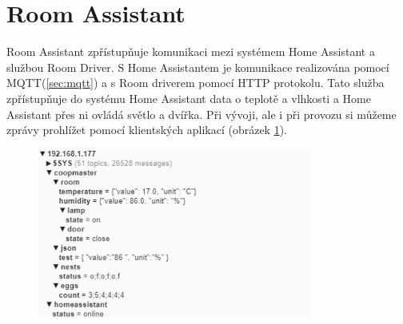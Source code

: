 \section{Room Assistant}\label{sec:room-assistant}

Room Assistant zpřístupňuje komunikaci mezi systémem Home Assistant a službou Room Driver.\newline
S Home Assistantem je komunikace realizována pomocí MQTT(\ref{sec:mqtt}) a s Room driverem pomocí HTTP protokolu.
Tato služba zpřístupňuje do systému Home Assistant data o teplotě a vlhkosti a Home Assistant přes ni ovládá světlo a dvířka.
Při vývoji, ale i při provozu si můžeme zprávy prohlížet pomocí klientských aplikací (obrázek \ref{fig:homeassistant_input_data_mqtt}).

\begin{figure}[h]
    \centering
    \includegraphics[width=0.8\textwidth]{img/homeassistant_input_data_mqtt}
    \label{fig:homeassistant_input_data_mqtt}
\end{figure}


